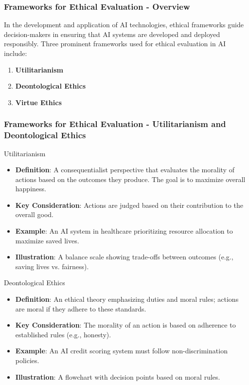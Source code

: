 \documentclass{beamer}
\begin{document}
\begin{frame}[fragile]
    \frametitle{Frameworks for Ethical Evaluation - Overview}
    In the development and application of AI technologies, ethical frameworks guide decision-makers in ensuring that AI systems are developed and deployed responsibly. 
    Three prominent frameworks used for ethical evaluation in AI include:
    
    \begin{enumerate}
        \item \textbf{Utilitarianism}
        \item \textbf{Deontological Ethics}
        \item \textbf{Virtue Ethics}
    \end{enumerate}
\end{frame}

\begin{frame}[fragile]
    \frametitle{Frameworks for Ethical Evaluation - Utilitarianism and Deontological Ethics}
        
    \begin{block}{Utilitarianism}
        \begin{itemize}
            \item \textbf{Definition}: A consequentialist perspective that evaluates the morality of actions based on the outcomes they produce. The goal is to maximize overall happiness.
            \item \textbf{Key Consideration}: Actions are judged based on their contribution to the overall good.
            \item \textbf{Example}: An AI system in healthcare prioritizing resource allocation to maximize saved lives.
            \item \textbf{Illustration}: A balance scale showing trade-offs between outcomes (e.g., saving lives vs. fairness).
        \end{itemize}
    \end{block}
    
    \begin{block}{Deontological Ethics}
        \begin{itemize}
            \item \textbf{Definition}: An ethical theory emphasizing duties and moral rules; actions are moral if they adhere to these standards.
            \item \textbf{Key Consideration}: The morality of an action is based on adherence to established rules (e.g., honesty).
            \item \textbf{Example}: An AI credit scoring system must follow non-discrimination policies.
            \item \textbf{Illustration}: A flowchart with decision points based on moral rules.
        \end{itemize}
    \end{block}
\end{frame}
\end{document}
